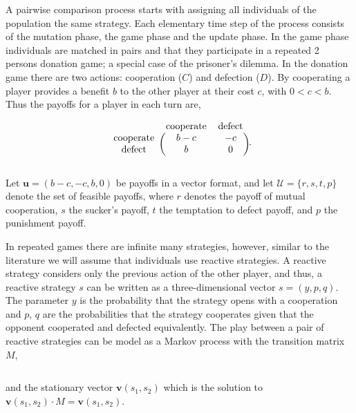 \documentclass[11pt]{article}
\theoremstyle{plainCl1}
\theoremstyle{plainCl2}
\begin{document}
A pairwise comparison process starts with assigning all
individuals of the population the same strategy. Each elementary time step of
the process consists of the mutation phase, the game phase and the update phase.
In the game phase individuals are matched in pairs and that they participate in
a repeated 2 persons donation game; a special case of the prisoner's dilemma. In
the donation game there are two actions: cooperation (\(C\)) and defection
(\(D\)). By cooperating a player provides a benefit \(b\) to the other player at
their cost \(c\), with \(0 < c < b\). Thus the payoffs for a player in each turn
are,

\begin{equation}
    \begin{blockarray}{ccc}
        & \text{cooperate} & \text{defect} \\
        \begin{block}{c(cc)}
            \text{cooperate} & b - c & -c \\
            \text{defect} & b & 0 \\
        \end{block}
    \end{blockarray}.
\end{equation}

Let \(\mathbf{u} = (b-c, -c, b, 0)\) be payoffs in a vector format, and let
\(\mathcal{U} = \{r, s, t, p\}\) denote the set of feasible payoffs, where \(r\)
denotes the payoff of mutual cooperation, \(s\) the sucker's payoff, \(t\) the
temptation to defect payoff, and \(p\) the punishment payoff.

In repeated games there are infinite many strategies, however, similar to the
literature we will assume that individuals use reactive strategies. A reactive strategy considers only the
previous action of the other player, and thus, a reactive strategy \(s\) can be
written as a three-dimensional vector \(s=(y, p, q)\). The parameter \(y\) is
the probability that the strategy opens with a cooperation and \(p\), \(q\) are
the probabilities that the strategy cooperates given that the opponent
cooperated and defected equivalently. The play between a pair of reactive
strategies can be model as a Markov process with the transition matrix \(M\),

\begin{equation}\label{eq:transition_matrix}
  
\end{equation}

and the stationary vector \(\mathbf{v}(s_1,s_2)\)
which is the solution to \(\mathbf{v}(s_1,s_2) \cdot M 
= \mathbf{v}(s_1,s_2)\).
\end{document}
